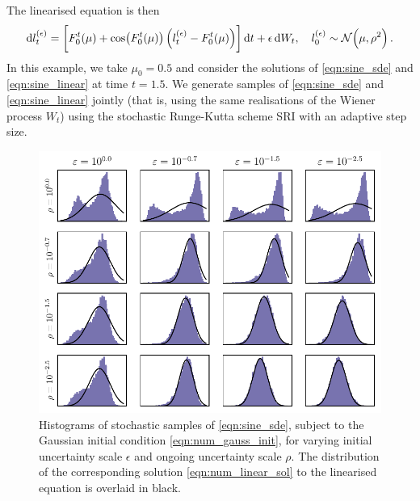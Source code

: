 The linearised equation is then
\begin{equation}
	\dif l_t^{(\epsilon)} = \left[F_0^t\!\left(\mu\right) + \cos\!\left(F_0^t\!\left(\mu\right)\right)\left(l_t^{(\epsilon)} - F_0^t\!\left(\mu\right)\right)\right]\dif t + \epsilon \dif W_t, \quad l_0^{(\epsilon)} \isGauss{\mu, \rho^2}.
    \label{eqn:sine_linear}
\end{equation}
In this example, we take \(\mu_0 = 0.5\) and consider the solutions of \eqref{eqn:sine_sde} and \eqref{eqn:sine_linear} at time \(t = 1.5\).
We generate samples of \ref{eqn:sine_sde} and \eqref{eqn:sine_linear} jointly (that is, using the same realisations of the Wiener process \(W_t\)) using the stochastic Runge-Kutta scheme SRI \cite{Rossler_2010_RungeKuttaMethodsStrong} with an adaptive step size.

\begin{figure}
    \centering
    \includegraphics[width=\textwidth]{chp04_paper_numerics/figures/sine/selected_hists.pdf}
		\caption{Histograms of stochastic samples of \eqref{eqn:sine_sde}, subject to the Gaussian initial condition \eqref{eqn:num_gauss_init}, for varying initial uncertainty scale \(\epsilon\) and ongoing uncertainty scale \(\rho\).
		The distribution of the corresponding solution \eqref{eqn:num_linear_sol} to the linearised equation is overlaid in black.}
    \label{fig:sine_hists}
\end{figure}

